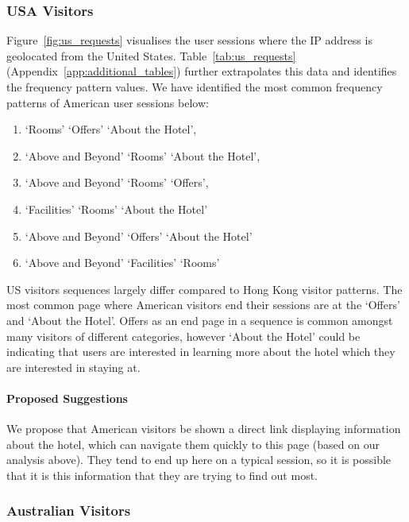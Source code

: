 \subsubsection{USA Visitors}
\label{sec:results:countries:us}

Figure~\ref{fig:us_requests} visualises the user sessions where the IP address is geolocated from the United States. Table~\ref{tab:us_requests}  (Appendix~\ref{app:additional_tables}) further extrapolates this data and identifies the frequency pattern values. We have identified the most common frequency patterns of American user sessions below:

\begin{enumerate}
  \item `Rooms' \ra{} `Offers' \ra{} `About the Hotel',
  \item `Above and Beyond' \ra{} `Rooms' \ra{} `About the Hotel',
  \item `Above and Beyond' \ra{} `Rooms' \ra{} `Offers',
  \item `Facilities' \ra{} `Rooms' \ra{} `About the Hotel'
  \item `Above and Beyond' \ra{} `Offers' \ra{} `About the Hotel'
  \item `Above and Beyond' \ra{} `Facilities' \ra{} `Rooms'
\end{enumerate}

US visitors sequences largely differ compared to Hong Kong visitor patterns. The most common page where American visitors end their sessions are at the `Offers' and `About the Hotel'. Offers as an end page in a sequence is common amongst many visitors of different categories, however `About the Hotel' could be indicating that users are interested in learning more about the hotel which they are interested in staying at.

\paragraph{Proposed Suggestions} We propose that American visitors be shown a direct link displaying information about the hotel, which can navigate them quickly to this page (based on our analysis above). They tend to end up here on a typical session, so it is possible that it is this information that they are trying to find out most.


\subsubsection{Australian Visitors}
\label{sec:results:countries:au}

